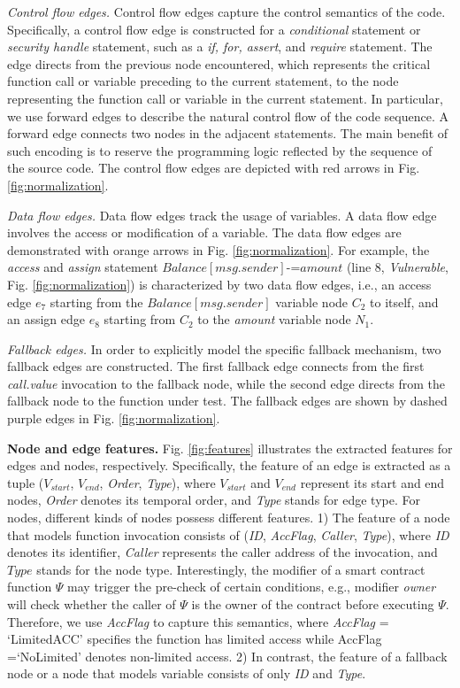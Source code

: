 \emph{Control flow edges.} Control flow edges capture the control semantics of the code. Specifically, a control flow edge is constructed for a \emph{conditional} statement or \emph{security handle} statement, such as a \emph{if, for, assert}, and \emph{require} statement. The edge directs from the previous node encountered, which represents the critical function call or variable preceding to the current statement, to the node representing the function call or variable in the current statement. In particular, we use forward edges to describe the natural control flow of the code sequence. A forward edge connects two nodes in the adjacent statements. The main benefit of such encoding is to reserve the programming logic reflected by the sequence of the source code. The control flow edges are depicted with red arrows in Fig. \ref{fig:normalization}.

\emph{Data flow edges.} Data flow edges track the usage of variables. A data flow edge involves the access or modification of a variable. The data flow edges are demonstrated with orange arrows in Fig. \ref{fig:normalization}. For example, the \emph{access} and \emph{assign} statement $Balance[msg.sender]$-=$amount$ (line 8, \emph{Vulnerable}, Fig. \ref{fig:normalization}) is characterized by two data flow edges, i.e., an access edge $e_7$ starting from the $Balance[msg.sender]$ variable node $C_2$ to itself, and an assign edge $e_8$ starting from $C_2$ to the \emph{amount} variable node $N_1$.

\emph{Fallback edges.} {In order to explicitly model the specific fallback mechanism, two fallback edges are constructed. The first fallback edge connects from the first \emph{call.value} invocation to the fallback node, while the second edge directs from the fallback node to the function under test. The fallback edges are shown by dashed purple edges in Fig. \ref{fig:normalization}}.

\textbf{Node and edge features.} Fig. \ref{fig:features} illustrates the extracted features for edges and nodes, respectively. Specifically, the feature of an edge is extracted as a tuple ($V_{start}$, $V_{end}$, \emph{Order}, \emph{Type}), where $V_{start}$ and $V_{end}$ represent its start and end nodes, \emph{Order} denotes its temporal order, and \emph{Type} stands for edge type. For nodes, different kinds of nodes possess different features. 1) The feature of a node that models function invocation consists of (\emph{ID}, \emph{AccFlag}, \emph{Caller}, \emph{Type}), where \emph{ID} denotes its identifier, \emph{Caller} represents the caller address of the invocation, and $Type$ stands for the node type. Interestingly, the modifier of a smart contract function $\Psi$ may trigger the pre-check of certain conditions, e.g., modifier \emph{owner} will check whether the caller of $\Psi$ is the owner of the contract before executing $\Psi$. Therefore, we use \emph{AccFlag} to capture this semantics, where \emph{AccFlag} = `LimitedACC' specifies the function has limited access while AccFlag =`NoLimited' denotes non-limited access. 2) In contrast, the feature of a fallback node or a node that models variable consists of only \emph{ID} and \emph{Type}.

